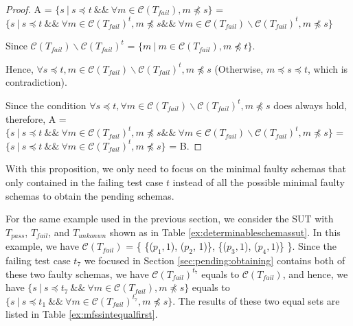 \begin{proof}

A = $\{ s\ |\  s \preceq t\ \&\&\ \forall m \in \mathcal{C}(T_{fail}),  m \npreceq s \}$
 =
$\{ s\ |\  s \preceq t\ \&\&\ \forall m \in \mathcal{C}(T_{fail})^{t},  m \npreceq s \&\&\   \forall m \in \mathcal{C}(T_{fail}) \backslash \mathcal{C}(T_{fail})^{t},  m \npreceq s  \}$

Since $\mathcal{C}(T_{fail}) \backslash \mathcal{C}(T_{fail})^{t}$ = $\{ m \ | \ m \in \mathcal{C}(T_{fail}), m \npreceq t \}$.

Hence, $\forall s \preceq t, m \in \mathcal{C}(T_{fail}) \backslash \mathcal{C}(T_{fail})^{t},  m \npreceq s$ (Otherwise, $m \preceq s \preceq t$, which is contradiction).

Since the condition $\forall s \preceq t, \forall m \in \mathcal{C}(T_{fail}) \backslash \mathcal{C}(T_{fail})^{t},  m \npreceq s $ does always hold, therefore, A =
$\{ s\ |\  s \preceq t\ \&\&\ \forall m \in \mathcal{C}(T_{fail})^{t},  m \npreceq s \&\&\   \forall m \in \mathcal{C}(T_{fail}) \backslash \mathcal{C}(T_{fail})^{t},  m \npreceq s  \}$  =
$\{ s\ |\  s \preceq t\ \&\&\ \forall m \in \mathcal{C}(T_{fail})^{t},  m \npreceq s \}$ = B.
\end{proof}

With this proposition, we only need to focus on the minimal faulty schemas that only contained in the failing test case $t$ instead of all the possible minimal faulty schemas to obtain the pending schemas. %

For the same example used in the previous section, we consider the SUT with $T_{pass}$, $T_{fail}$, and $T_{unkonwn}$ shown as in Table \ref{ex:determinableschemassut}. In this example, we have $\mathcal{C}(T_{fail})$ = \{ \{($p_{1}, 1$), ($p_{2}$, 1)\},  \{($p_{3}, 1$), ($p_{4}, 1$)\} \}. Since the failing test case $t_{7}$ we focused in Section \ref{sec:pending:obtaining} contains both of these two faulty schemas, we have $\mathcal{C}(T_{fail})^{t_{7}}$ equals to $\mathcal{C}(T_{fail})$, and hence, we have $\{ s\ |\  s \preceq t_{7}\ \&\&\ \forall m \in \mathcal{C}(T_{fail}),  m \npreceq s \}$  equals to $\{ s\ |\  s \preceq t_{1}\ \&\&\ \forall m \in \mathcal{C}(T_{fail})^{t_{7}},  m \npreceq s \}$. The results of these two equal sets are listed in Table \ref{ex:mfssintequalfirst}.

